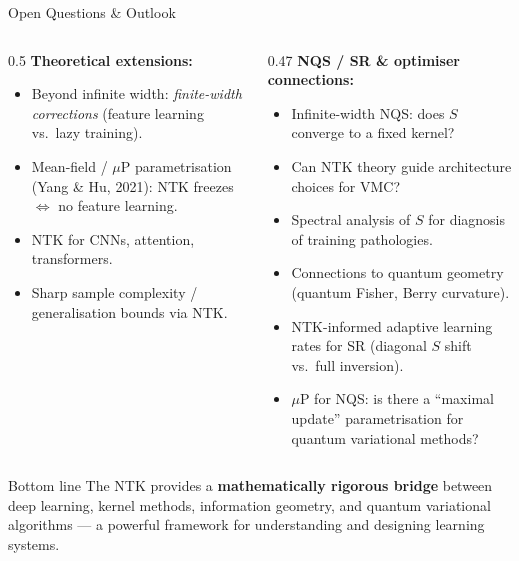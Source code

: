 \documentclass[aspectratio=169, 10pt]{beamer}
\begin{document}
\begin{frame}{Open Questions \& Outlook}
  \begin{columns}[T]
    \begin{column}{0.5\textwidth}
      \textbf{Theoretical extensions:}
      \begin{itemize}
        \item Beyond infinite width: \emph{finite-width corrections} (feature learning vs.\ lazy training).
        \item Mean-field / $\mu$P parametrisation (Yang \& Hu, 2021): NTK freezes $\Leftrightarrow$ no feature learning.
        \item NTK for CNNs, attention, transformers.
        \item Sharp sample complexity / generalisation bounds via NTK.
      \end{itemize}
    \end{column}
    \begin{column}{0.47\textwidth}
      \textbf{NQS / SR \& optimiser connections:}
      \begin{itemize}
        \item Infinite-width NQS: does $S$ converge to a fixed kernel?
        \item Can NTK theory guide architecture choices for VMC?
        \item Spectral analysis of $S$ for diagnosis of training pathologies.
        \item Connections to quantum geometry (quantum Fisher, Berry curvature).
        \item NTK-informed adaptive learning rates for SR (diagonal $S$ shift vs.\ full inversion).
        \item $\mu$P for NQS: is there a ``maximal update'' parametrisation for quantum variational methods?
      \end{itemize}
    \end{column}
  \end{columns}

  \vspace{0.5em}
  \begin{exampleblock}{Bottom line}
    The NTK provides a \textbf{mathematically rigorous bridge} between deep learning, kernel methods, information geometry, and quantum variational algorithms — a powerful framework for understanding and designing learning systems.
  \end{exampleblock}
\end{frame}
\end{document}
